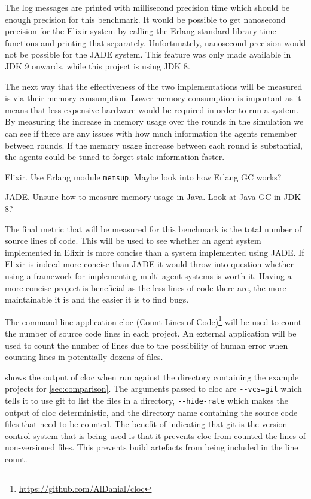 The log messages are printed with millisecond precision time which should be enough precision for this benchmark.
It would be possible to get nanosecond precision for the Elixir system by calling the Erlang standard library time functions and printing that separately.
Unfortunately, nanosecond precision would not be possible for the JADE system.
This feature was only made available in JDK 9 onwards, while this project is using JDK 8.

The next way that the effectiveness of the two implementations will be measured is via their memory consumption.
Lower memory consumption is important as it means that less expensive hardware would be required in order to run a system.
By measuring the increase in memory usage over the rounds in the simulation we can see if there are any issues with how much information the agents remember between rounds.
If the memory usage increase between each round is substantial, the agents could be tuned to forget stale information faster.

Elixir.
Use Erlang module \verb|memsup|.
Maybe look into how Erlang GC works?

JADE\@.
Unsure how to measure memory usage in Java.
Look at Java GC in JDK 8?

The final metric that will be measured for this benchmark is the total number of source lines of code.
This will be used to see whether an agent system implemented in Elixir is more concise than a system implemented using JADE\@.
If Elixir is indeed more concise than JADE it would throw into question whether using a framework for implementing multi-agent systems is worth it.
Having a more concise project is beneficial as the less lines of code there are, the more maintainable it is and the easier it is to find bugs.

The command line application cloc (Count Lines of Code)\footnote{\url{https://github.com/AlDanial/cloc}} will be used to count the number of source code lines in each project.
An external application will be used to count the number of lines due to the possibility of human error when counting lines in potentially dozens of files.

 shows the output of cloc when run against the directory containing the example projects for \cref{sec:comparison}.
The arguments passed to cloc are \verb|--vcs=git| which tells it to use git to list the files in a directory, \verb|--hide-rate| which makes the output of cloc deterministic, and the directory name containing the source code files that need to be counted.
The benefit of indicating that git is the version control system that is being used is that it prevents cloc from counted the lines of non-versioned files.
This prevents build artefacts from being included in the line count.

